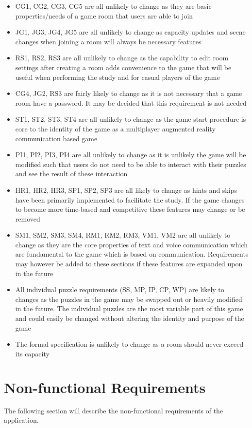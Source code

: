 \documentclass[12pt]{article}
\begin{document}
\begin{itemize}
    \item CG1, CG2, CG3, CG5 are all unlikely to change as they are basic properties/needs of a game room that users are able to join
    \item JG1, JG3, JG4, JG5 are all unlikely to change as capacity updates and scene changes when joining a room will always be necessary features
    \item RS1, RS2, RS3 are all unlikely to change as the capability to edit room settings after creating a room adds convenience to the game that will be useful when performing the study and for casual players of the game
    \item CG4, JG2, RS3 are fairly likely to change as it is not necessary that a game room have a password. It may be decided that this requirement is not needed
    \item ST1, ST2, ST3, ST4 are all unlikely to change as the game start procedure is core to the identity of the game as a multiplayer augmented reality communication based game
    \item PI1, PI2, PI3, PI4 are all unlikely to change as it is unlikely the game will be modified such that users do not need to be able to interact with their puzzles and see the result of these interaction
    \item HR1, HR2, HR3, SP1, SP2, SP3 are all likely to change as hints and skips have been primarily implemented to facilitate the study. If the game changes to become more time-based and competitive these features may change or be removed
    \item SM1, SM2, SM3, SM4, RM1, RM2, RM3, VM1, VM2 are all unlikely to change as they are the core properties of text and voice communication which are fundamental to the game which is based on communication. Requirements may however be added to these sections if these features are expanded upon in the future
    \item All individual puzzle requirements (SS, MP, IP, CP, WP) are likely to changes as the puzzles in the game may be swapped out or heavily modified in the future. The individual puzzles are the most variable part of this game and could easily be changed without altering the identity and purpose of the game
    \item The formal specification is unlikely to change as a room should never exceed its capacity
\end{itemize}

\section{Non-functional Requirements}
The following section will describe the non-functional requirements of the application.
\end{document}
